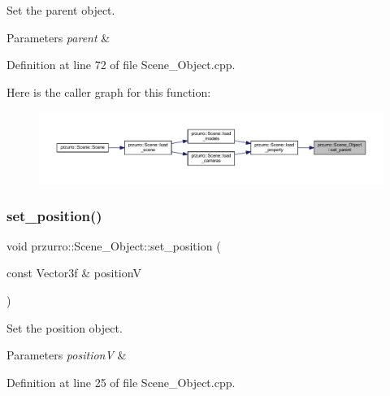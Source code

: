 Set the parent object. 


\begin{DoxyParams}{Parameters}
{\em parent} & \\
\hline
\end{DoxyParams}


Definition at line 72 of file Scene\+\_\+\+Object.\+cpp.

Here is the caller graph for this function\+:
\nopagebreak
\begin{figure}[H]
\begin{center}
\leavevmode
\includegraphics[width=350pt]{d9/d84/classprzurro_1_1_scene___object_aad9cc81e105d3321828287d736b01525_icgraph}
\end{center}
\end{figure}
\mbox{\label{classprzurro_1_1_scene___object_adfb1f8a52324f4618474a89da64b65d6}} 
\subsubsection{\texorpdfstring{set\_position()}{set\_position()}}
{\footnotesize\ttfamily void przurro\+::\+Scene\+\_\+\+Object\+::set\+\_\+position (\begin{DoxyParamCaption}\item[{const Vector3f \&}]{positionV }\end{DoxyParamCaption})}



Set the position object. 


\begin{DoxyParams}{Parameters}
{\em positionV} & \\
\hline
\end{DoxyParams}


Definition at line 25 of file Scene\+\_\+\+Object.\+cpp.


